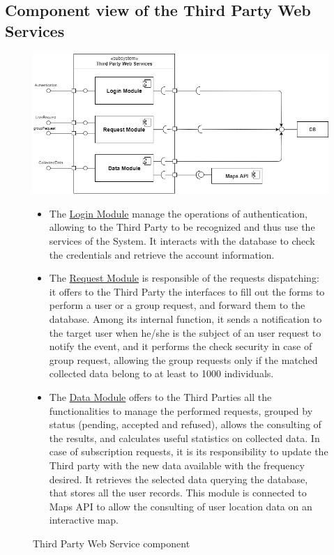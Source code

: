 \subsection{Component view of the Third Party Web Services}
\begin{figure}[H]
    \centering
    \includegraphics[scale=0.4]{DD/Pictures/ThirdPartyServiceDiagram(1).png}
    \caption{Third Party Web Service component}
    

\begin{itemize}
\item  The \underline{Login Module} manage the operations of authentication, allowing to the Third Party to be recognized and thus use the services of the System. It interacts with the database to check the credentials and retrieve the account information.

    \item The \underline{Request Module} is responsible of
    the requests dispatching: it offers to the Third Party the interfaces to fill out the forms to perform a user or a group request, and  forward them to the database. Among its internal function, it sends a notification to the target user when he/she is the subject of an user request to notify the event, and it performs the check security in case of group request, allowing the group requests only if the matched collected data belong to at least to 1000 individuals.
    
    \item The \underline{Data Module}  offers to the Third Parties all the functionalities to manage the performed requests, grouped by status (pending, accepted and refused), allows the consulting of the results, and calculates useful statistics on collected data. In case of subscription requests, it is its responsibility to update the Third party with the new data available with the frequency desired. It retrieves the selected data querying the database, that stores all the user records.
    This module is connected to Maps API to allow the consulting of user location data on an interactive map.
    
    
   \end{itemize} 
   
    
\end{figure}
